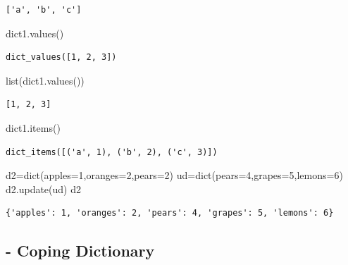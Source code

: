 \documentclass[
  a4paper,
  DIV=11,
  numbers=noendperiod]{scrreprt}
\newenvironment{Shaded}{\begin{snugshade}}{\end{snugshade}}
\newcommand{\BuiltInTok}[1]{\textcolor[rgb]{0.00,0.23,0.31}{#1}}
\newcommand{\DecValTok}[1]{\textcolor[rgb]{0.68,0.00,0.00}{#1}}
\newcommand{\NormalTok}[1]{\textcolor[rgb]{0.00,0.23,0.31}{#1}}
\newcommand{\OperatorTok}[1]{\textcolor[rgb]{0.37,0.37,0.37}{#1}}
\begin{document}
\begin{verbatim}
['a', 'b', 'c']
\end{verbatim}

\begin{Shaded}
\begin{Highlighting}[]
\NormalTok{dict1.values()}
\end{Highlighting}
\end{Shaded}

\begin{verbatim}
dict_values([1, 2, 3])
\end{verbatim}

\begin{Shaded}
\begin{Highlighting}[]
\BuiltInTok{list}\NormalTok{(dict1.values())}
\end{Highlighting}
\end{Shaded}

\begin{verbatim}
[1, 2, 3]
\end{verbatim}

\begin{Shaded}
\begin{Highlighting}[]
\NormalTok{dict1.items()}
\end{Highlighting}
\end{Shaded}

\begin{verbatim}
dict_items([('a', 1), ('b', 2), ('c', 3)])
\end{verbatim}

\begin{Shaded}
\begin{Highlighting}[]
\NormalTok{d2}\OperatorTok{=}\BuiltInTok{dict}\NormalTok{(apples}\OperatorTok{=}\DecValTok{1}\NormalTok{,oranges}\OperatorTok{=}\DecValTok{2}\NormalTok{,pears}\OperatorTok{=}\DecValTok{2}\NormalTok{)}
\NormalTok{ud}\OperatorTok{=}\BuiltInTok{dict}\NormalTok{(pears}\OperatorTok{=}\DecValTok{4}\NormalTok{,grapes}\OperatorTok{=}\DecValTok{5}\NormalTok{,lemons}\OperatorTok{=}\DecValTok{6}\NormalTok{)}
\NormalTok{d2.update(ud)}
\NormalTok{d2}
\end{Highlighting}
\end{Shaded}

\begin{verbatim}
{'apples': 1, 'oranges': 2, 'pears': 4, 'grapes': 5, 'lemons': 6}
\end{verbatim}

\subsection{- Coping Dictionary}\label{coping-dictionary}
\end{document}
